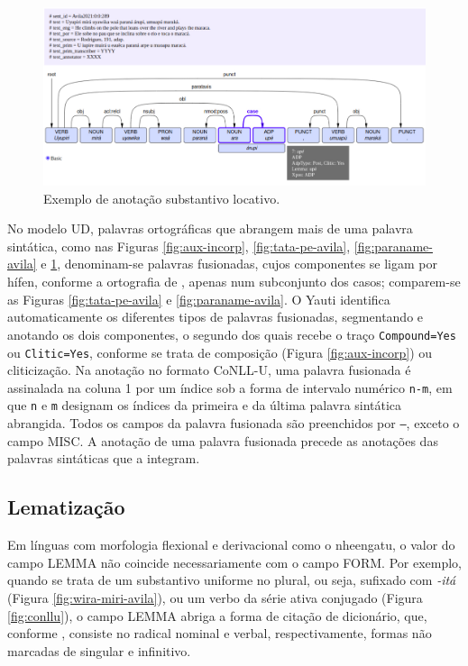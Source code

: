 \documentclass[portuguese]{textolivre}
\newcommand{\conll}{CoNLL-U}
\begin{document}
\begin{figure}[htbp]
  \centering
  \begin{minipage}{.75\textwidth}
    \includegraphics[width=\linewidth]{figures/arupi.pdf}
    \caption{Exemplo de anotação substantivo locativo.}
    \label{fig:arupi}
  \end{minipage}
\end{figure}

No modelo UD, palavras ortográficas que abrangem mais de uma palavra sintática, como nas Figuras \ref{fig:aux-incorp}, \ref{fig:tata-pe-avila}, \ref{fig:paraname-avila} e \ref{fig:arupi}, denominam-se palavras fusionadas, cujos componentes se ligam por hífen, conforme a ortografia de \textcite{avila2021}, apenas num subconjunto dos casos; comparem-se as Figuras \ref{fig:tata-pe-avila} e \ref{fig:paraname-avila}.  O Yauti identifica automaticamente os diferentes tipos de palavras fusionadas, segmentando e anotando os dois componentes, o segundo dos quais recebe o traço \texttt{Compound=Yes} ou \texttt{Clitic=Yes}, conforme se trata de composição (Figura \ref{fig:aux-incorp}) ou cliticização. Na anotação no formato \conll, uma palavra fusionada é assinalada na coluna 1 por um índice sob a forma de intervalo numérico \texttt{n-m}, em que \texttt{n} e \texttt{m} designam os índices da primeira e da última palavra sintática abrangida. Todos os campos da palavra fusionada são preenchidos por \texttt{—}, exceto o campo MISC. A anotação de uma palavra fusionada precede as anotações das palavras sintáticas que a integram.

\subsection{Lematização}\label{subsec:lematizacao}

Em línguas com morfologia flexional e derivacional como o nheengatu, o valor do campo LEMMA não coincide necessariamente com o campo FORM. Por exemplo, quando se trata de um substantivo uniforme no plural, ou seja, sufixado com \textit{-itá} (Figura \ref{fig:wira-miri-avila}), ou um verbo da série ativa conjugado (Figura \ref{fig:conllu}), o campo LEMMA abriga a forma de citação de dicionário, que, conforme \textcite{avila2021}, consiste no radical nominal e verbal, respectivamente, formas não marcadas de singular e infinitivo. 
\end{document}
